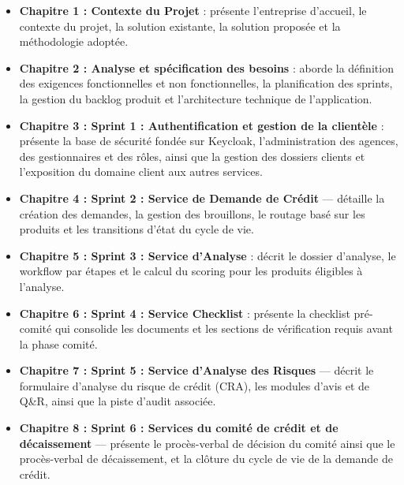 \begin{itemize}

    \item[\ding{226}] \textbf{Chapitre 1 : Contexte du Projet} : présente l'entreprise
    d'accueil, le contexte du projet, la solution existante, la solution proposée et la
    méthodologie adoptée.

    \item[\ding{226}] \textbf{Chapitre 2 : Analyse et spécification des besoins} : aborde
    la définition des exigences fonctionnelles et non fonctionnelles, la planification des
    sprints, la gestion du backlog produit et l'architecture technique de l'application.

    \item[\ding{226}] \textbf{Chapitre 3 : Sprint 1 : Authentification et gestion de la
    clientèle} : présente la base de sécurité fondée sur Keycloak, l'administration des
    agences, des gestionnaires et des rôles, ainsi que la gestion des dossiers clients et
    l'exposition du domaine client aux autres services.

    \item[\ding{226}] \textbf{Chapitre 4 : Sprint 2 : Service de Demande de Crédit} —
    détaille la création des demandes, la gestion des brouillons, le routage basé sur les
    produits et les transitions d'état du cycle de vie.

    \item[\ding{226}] \textbf{Chapitre 5 : Sprint 3 : Service d'Analyse} : décrit le
    dossier d'analyse, le workflow par étapes et le calcul du scoring pour les produits
    éligibles à l'analyse.

    \item[\ding{226}] \textbf{Chapitre 6 : Sprint 4 : Service Checklist} : présente la
    checklist pré-comité qui consolide les documents et les sections de vérification requis
    avant la phase comité.

    \item[\ding{226}] \textbf{Chapitre 7 : Sprint 5 : Service d'Analyse des Risques} —
    décrit le formulaire d'analyse du risque de crédit (CRA), les modules d'avis et de
    Q\&R, ainsi que la piste d'audit associée.

    \item[\ding{226}] \textbf{Chapitre 8 : Sprint 6 : Services du comité de crédit et de décaissement} —
    présente le procès-verbal de décision du comité ainsi que le procès-verbal de décaissement,
et la clôture du cycle de vie de la demande de crédit.


\end{itemize}
